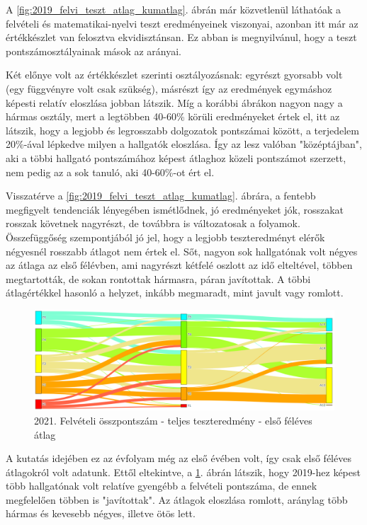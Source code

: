 \documentclass[12pt]{article}
\begin{document}
A \ref{fig:2019_felvi_teszt_atlag_kumatlag}. ábrán már közvetlenül láthatóak a felvételi és matematikai-nyelvi teszt eredményeinek viszonyai, azonban itt már az értékkészlet van felosztva ekvidisztánsan. Ez abban is megnyilvánul, hogy a teszt pontszámosztályainak mások az arányai. 

Két előnye volt az értékkészlet szerinti osztályozásnak: egyrészt gyorsabb volt (egy függvényre volt csak szükség), másrészt így az eredmények egymáshoz képesti relatív eloszlása jobban látszik. Míg a korábbi ábrákon nagyon nagy a hármas osztály, mert a legtöbben 40-60\% körüli eredményeket értek el, itt az látszik, hogy a legjobb és legrosszabb dolgozatok pontszámai között, a terjedelem 20\%-ával lépkedve milyen a hallgatók eloszlása. Így az lesz valóban "középtájban", aki a többi hallgató pontszámához képest átlaghoz közeli pontszámot szerzett, nem pedig az a sok tanuló, aki 40-60\%-ot ért el.

Visszatérve a \ref{fig:2019_felvi_teszt_atlag_kumatlag}. ábrára, a fentebb megfigyelt tendenciák lényegében ismétlődnek, jó eredményeket jók, rosszakat rosszak követnek nagyrészt, de továbbra is változatosak a folyamok. Összefüggőség szempontjából jó jel, hogy a legjobb teszteredményt elérők négyesnél rosszabb átlagot nem értek el. Sőt, nagyon sok hallgatónak volt négyes az átlaga az első félévben, ami nagyrészt kétfelé oszlott az idő elteltével, többen megtartották, de sokan rontottak hármasra, páran javítottak. A többi átlagértékkel hasonló a helyzet, inkább megmaradt, mint javult vagy romlott.


\begin{figure}[H]
\centering
\includegraphics[width = \textwidth]{kepek/2021_felvi_teszt_atlag.png}
\caption{2021. Felvételi összpontszám - teljes teszteredmény - első féléves átlag}
\label{fig:2021_felvi_teszt_atlag}
\end{figure}

A kutatás idejében ez az évfolyam még az első évében volt, így csak első féléves átlagokról volt adatunk. Ettől eltekintve, a \ref{fig:2021_felvi_teszt_atlag}. ábrán látszik, hogy 2019-hez képest több hallgatónak volt relatíve gyengébb a felvételi pontszáma, de ennek megfelelően többen is "javítottak". Az átlagok eloszlása romlott, aránylag több hármas és kevesebb négyes, illetve ötös lett. 
\end{document}
